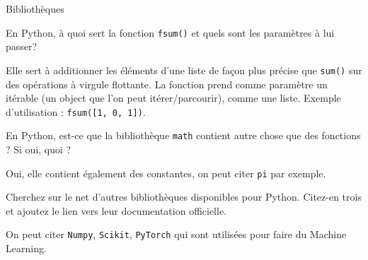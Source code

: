\begin{section}{Bibliothèques}
\begin{solution}
    
\end{solution} 
\begin{Exercice}[3 minutes]
	En Python, à quoi sert la fonction \lstinline{fsum()} et quels sont les paramètres à lui passer? 
\end{Exercice}
\begin{solution}
	Elle sert à additionner les éléments d'une liste de façon plus précise que \lstinline{sum()} sur des opérations à virgule flottante. La fonction prend comme paramètre un itérable (un object que l'on peut itérer/parcourir), comme une liste. Exemple d'utilisation : \lstinline{fsum([1, 0, 1])}.
\end{solution} 

\begin{Exercice}[3 minutes]
	En Python, est-ce que la bibliothèque \lstinline{math} contient autre chose que des fonctions ? Si oui, quoi ? 
\end{Exercice} 
\begin{solution}
	Oui, elle contient également des constantes, on peut citer \lstinline{pi} par exemple.
\end{solution} 
\begin{Exercice}[10 minutes]
	Cherchez sur le net d'autres bibliothèques disponibles pour Python. Citez-en trois et ajoutez le lien vers leur documentation officielle.
\end{Exercice}    
\begin{solution}
	On peut citer \lstinline{Numpy}, \lstinline{Scikit}, \lstinline{PyTorch} qui sont utilisées pour faire du Machine Learning. \\
	

\end{solution}
\end{section}
